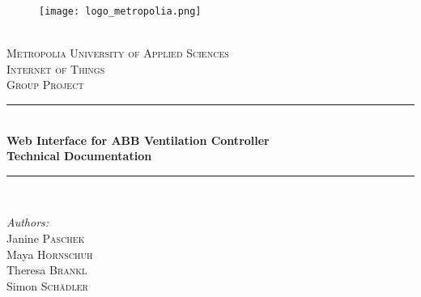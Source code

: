 \newcommand{\HRule}{\rule{\linewidth}{0.5mm}} %
\thispagestyle{empty}
\begin{center} %
 

\begin{figure}
	\setlength{\belowcaptionskip}{50pt}
	\begin{center}
   		\texttt{[image: logo\_metropolia.png]}
	\end{center}
\end{figure}


\phantom{This text will be invisible}\\[1cm]
\textsc{\Large Metropolia University of Applied Sciences}\\[1.25cm] %
\textsc{\Large Internet of Things}\\[1.0cm] %
\textsc{\Large Group Project}\\[1.5cm] %

\HRule \\[0.2cm]
\large{ \bfseries Web Interface for ABB Ventilation Controller\\
Technical Documentation
 }\\[0.02cm] %
\HRule \\[1.5cm]
 

\begin{minipage}{0.5\linewidth}
\begin{flushleft}\normalsize
\emph{Authors:}\\
Janine  \textsc{Paschek} %
\\
Maya \textsc{Hornschuh} %
\\
Theresa \textsc{Brankl} %
\\
Simon \textsc{Schädler} %
\end{flushleft}
\end{minipage}


\end{center}
